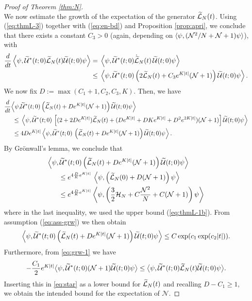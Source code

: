 \documentclass[11pt,a4paper]{article}
\newcommand{\done}{}
\newcommand{\ech}[2]{#2}	%
\newcommand{\cU}{{\cal U}}
\newcommand{\wt}{\widetilde}
\newcommand{\cH}{{\cal H}}
\newcommand{\cL}{{\cal L}}
\newcommand{\cN}{{\cal N}}
\newcommand{\Ncal}{\mathcal{N}}		%
\newcommand{\scal}[2]{\big<#1,#2\big>} %
\begin{document}
\begin{proof}[Proof of Theorem \ref{thm:N}]
\[ \]
We now estimate the growth of the expectation\done{} of the generator $\wt{\cL}_N (t)$. Using (\ref{eq:thmL-3}) together with (\ref{eq:en-bd}) and Proposition \ref{prop:apri}, we conclude that there exists a constant $C_3 >0$ (again, depending on $\langle \psi , (\cN^2/ N + \cN + 1) \psi \rangle$\ech{ and on the constant $C$ in (\ref{eq:varphi-bds})}{}), with 
\[ \begin{split}
\frac{d}{dt} \left\langle \psi, \wt{\cU}^* (t;0) \wt{\cL}_N (t) \wt{\cU} (t;0) \psi \right\rangle = \; & \left\langle \psi, \wt{\cU}^* (t;0) \dot{\wt{\cL}}_N (t) \, \wt{\cU} (t;0) \psi \right\rangle \\ \leq \; & \left\langle \psi , \wt{\cU}^* (t;0) \left( 2 \wt{\cL}_N (t) + C_3 e^{K|t|} (\cN + 1) \right) \wt{\cU} (t;0) \psi \right\rangle. 
\end{split} \]
We now fix $D := \max (C_1 + 1, C_2 , C_3 , K)$. Then, we have
\[ \begin{split} 
\frac{d}{dt} \Big\langle \psi , &\wt{\cU}^* (t;0) \left( \wt{\cL}_N (t) + D e^{K \lvert t\rvert} (\cN + 1) \right) \wt{\cU} (t;0) \psi \Big\rangle \\
\leq \; & \left\langle \psi, \wt{\cU}^* (t;0) \, \left[ (2 + 2D e^{K|t|}) \wt{\cL}_N (t) + (D e^{K |t|} +D K e^{K |t|} + D^2 e^{2K |t|}) (\cN + 1) \right] \wt{\cU} (t;0) \psi \right\rangle\\
\leq \; & 4D e^{K |t|} \left\langle \psi, \wt{\cU}^* (t;0) \, \left( \wt{\cL}_N (t) + D e^{K|t|} (\cN + 1) \right) \wt{\cU} (t;0) \psi \right\rangle.
\end{split} \]
By Gr\"onwall's lemma, we conclude that
\[ \begin{split}
\Big\langle \psi , \wt{\cU}^* &(t;0) \left( \wt{\cL}_N (t) + D e^{K \lvert t\rvert} (\cN + 1) \right) \wt{\cU} (t;0) \psi \Big\rangle \\
\leq \; & e^{4 \frac{D}{K} e^{K |t|}} \, \left\langle \psi , \left( \wt{\cL}_N (0) + D(\cN + 1)\right) \psi \right\rangle \\
\leq \; &  e^{4 \frac{D}{K} e^{K |t|}} \left\langle \psi , \left( \frac{3}{2} \cH_N+ C \frac{\cN^2}{N} + C (\cN+ 1) \right) \psi \right\rangle
\end{split} \]
where in the last inequality, we used the upper bound (\ref{eq:thmL-1b}). From assumption (\ref{eq:ass-grw}) we then obtain 
\begin{equation}\label{eq:star}  \Big\langle \psi , \wt{\cU}^* (t;0) \left( \wt{\cL}_N (t) + 
D e^{K \lvert t\rvert} (\cN + 1) \right) \wt{\cU} (t;0) \psi \Big\rangle
\leq C \exp (c_1 \exp (c_2 |t|)).
\end{equation}
Furthermore, from \eqref{eq:grw-1} we have
\[-\frac{C_1}{2}e^{K\lvert t\rvert} \scal{\psi}{\wt{\cU}^* (t;0)(\Ncal+1)\wt{\cU}(t;0)\psi} \leq \scal{\psi}{\wt{\cU}^* (t;0) \wt{\cL}_N (t) \wt{\cU} (t;0)\psi}.\]
Inserting this in \eqref{eq:star} as a lower bound for $\wt{\cL}_N (t)$ and recalling $D-C_1 \geq 1$, we obtain the intended bound for the expectation of $\Ncal$.
\end{proof}
\end{document}
